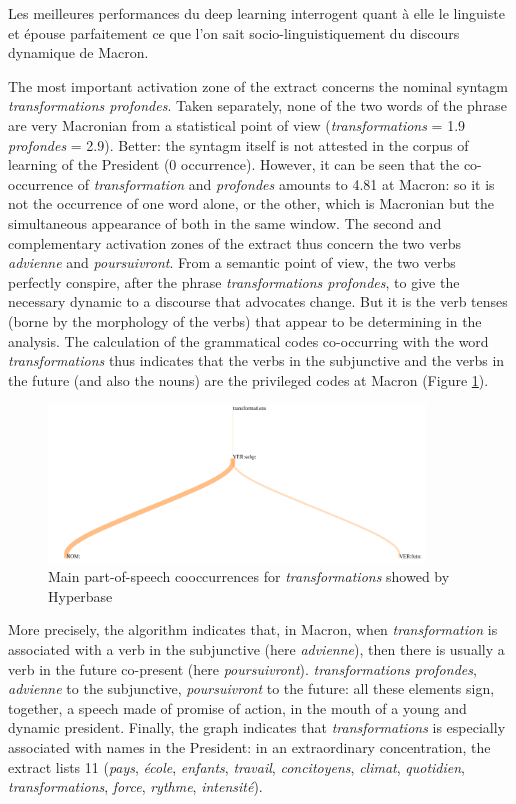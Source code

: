 Les meilleures performances du deep learning interrogent quant à elle le linguiste et épouse parfaitement ce que l'on sait socio-linguistiquement du discours dynamique de Macron.

The most important activation zone of the extract concerns the nominal syntagm \textit{transformations profondes}. Taken separately, none of the two words of the phrase are very Macronian from a statistical point of view (\textit{transformations} = 1.9 \textit{profondes} = 2.9). Better: the syntagm itself is not attested in the corpus of learning of the President (0 occurrence). However, it can be seen that the co-occurrence of \textit{transformation} and \textit{profondes} amounts to 4.81 at Macron: so it is not the occurrence of one word alone, or the other, which is Macronian but the simultaneous appearance of both in the same window. The second and complementary activation zones of the extract thus concern the two verbs \textit{advienne} and \textit{poursuivront}. From a semantic point of view, the two verbs perfectly conspire, after the phrase \textit{transformations profondes}, to give the necessary dynamic to a discourse that advocates change. But it is the verb tenses (borne by the morphology of the verbs) that appear to be determining in the analysis. The calculation of the grammatical codes co-occurring with the word \textit{transformations} thus indicates that the verbs in the subjunctive and the verbs in the future (and also the nouns) are the privileged codes at Macron (Figure \ref{macron}). 

\begin{figure}[h]
\begin{center}
\includegraphics[width=10cm]{img/macron_cooc.png}
\caption{Main part-of-speech cooccurrences for \textit{transformations} showed by Hyperbase}
\label{macron}
\end{center}
\end{figure}

More precisely, the algorithm indicates that, in Macron, when \textit{transformation} is associated with a verb in the subjunctive (here \textit{advienne}), then there is usually a verb in the future co-present (here \textit{poursuivront}). \textit{transformations profondes}, \textit{advienne} to the subjunctive, \textit{poursuivront} to the future: all these elements sign, together, a speech made of promise of action, in the mouth of a young and dynamic president. Finally, the graph indicates that \textit{transformations} is especially associated with names in the President: in an extraordinary concentration, the extract lists 11 (\textit{pays}, \textit{école}, \textit{enfants}, \textit{travail}, \textit{concitoyens}, \textit{climat}, \textit{quotidien}, \textit{transformations}, \textit{force}, \textit{rythme}, \textit{intensité}).

